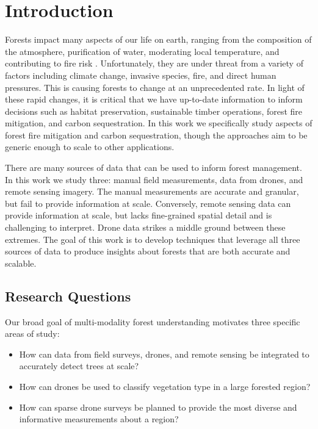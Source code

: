 
\chapter{Introduction} \label{chapIntroduction}
Forests impact many aspects of our life on earth, ranging from the composition of the atmosphere, purification of water, moderating local temperature, and contributing to fire risk \cite{IPCC2019ClimateReport}. Unfortunately, they are under threat from a variety of factors including climate change, invasive species, fire, and direct human pressures. This is causing forests to change at an unprecedented rate. In light of these rapid changes, it is critical that we have up-to-date information to inform decisions such as habitat preservation, sustainable timber operations, forest fire mitigation, and carbon sequestration. In this work we specifically study aspects of forest fire mitigation and carbon sequestration, though the approaches aim to be generic enough to scale to other applications. 

There are many sources of data that can be used to inform forest management. In this work we study three: manual field measurements, data from drones, and remote sensing imagery. The manual measurements are accurate and granular, but fail to provide information at scale. Conversely, remote sensing data can provide information at scale, but lacks fine-grained spatial detail and is challenging to interpret. Drone data strikes a middle ground between these extremes. The goal of this work is to develop techniques that leverage all three sources of data to produce insights about forests that are both accurate and scalable.
\section{Research Questions}
Our broad goal of multi-modality forest understanding motivates three specific areas of study:
\begin{itemize}
    \item How can data from field surveys, drones, and remote sensing be integrated to accurately detect trees at scale?
\end{itemize}
\begin{itemize}
    \item How can drones be used to classify vegetation type in a large forested region?
\end{itemize}
\begin{itemize}
    \item How can sparse drone surveys be planned to provide the most diverse and informative measurements about a region?
\end{itemize}

